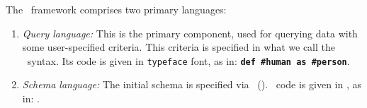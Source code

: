 The \dsl~framework comprises two primary languages: 
\begin{enumerate}
	\item \emph{Query language:} This is the primary component, used for querying data with some user-specified criteria. This criteria is specified in what we call the \dsl~syntax.
	Its code is given in \texttt{typeface} font, as in: 
	\texttt{\bfseries def \#human as \#person}.
	
	\item \emph{Schema language:} 
	The initial schema is specified via {\bf \dcl}~(\dclfull). %
	\dcl~code is given in , as in: . %
	
  \end{enumerate}


